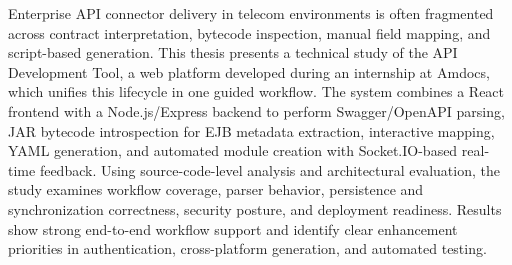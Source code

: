 \documentclass[USenglish,a4paper,12pt]{nitathesis}
\numberwithin{figure}{chapter}
\renewcommand{\headrulewidth}{0.5pt}
\begin{document}
\pagestyle{fancy}
\fancyhead[RO,RE]{\nouppercase\rightmark}
\fancyfoot[C]{\thepage}
\listoffigures
\listoftables
\newpage
{}
Enterprise API connector delivery in telecom environments is often fragmented across contract interpretation, bytecode inspection, manual field mapping, and script-based generation. This thesis presents a technical study of the API Development Tool, a web platform developed during an internship at Amdocs, which unifies this lifecycle in one guided workflow. The system combines a React frontend with a Node.js/Express backend to perform Swagger/OpenAPI parsing, JAR bytecode introspection for EJB metadata extraction, interactive mapping, YAML generation, and automated module creation with Socket.IO-based real-time feedback. Using source-code-level analysis and architectural evaluation, the study examines workflow coverage, parser behavior, persistence and synchronization correctness, security posture, and deployment readiness. Results show strong end-to-end workflow support and identify clear enhancement priorities in authentication, cross-platform generation, and automated testing.


\renewcommand{\headrulewidth}{0.5pt}
\pagestyle{fancy}
\fancyhead[RO,RE]{\nouppercase\rightmark}
\fancyfoot[C]{\thepage}
\tableofcontents
\newpage



\newpage
{}
\setcounter{page}{1}   

\fancyhf{}
\fancyhead[RO]{\slshape\nouppercase\rightmark{}}
\fancyhead[RE]{\slshape\nouppercase\leftmark{}}
\cfoot{\thepage}
\pagestyle{fancy}

\flushbottom

\flushbottom
\flushbottom

\flushbottom
\flushbottom

\flushbottom
\flushbottom

\flushbottom
\flushbottom

\flushbottom
\flushbottom

\flushbottom



\small




\appendix
\end{document}
